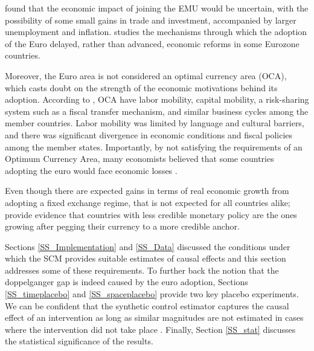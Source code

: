 \documentclass[12pt]{article}
\begin{document}
\cite{Feldstein1997} found that the economic impact of joining the EMU would be uncertain, with the possibility of some small gains in trade and investment, accompanied by larger unemployment and inflation. \cite{Fernandez2013} studies the mechanisms through which the adoption of the Euro delayed, rather than advanced, economic reforms in some Eurozone countries.

Moreover, the Euro area is not considered an optimal currency area (OCA), which casts doubt on the strength of the economic motivations behind its adoption. According to \citep{Mundell1961}, OCA have labor mobility, capital mobility, a risk-sharing system such as a fiscal transfer mechanism, and similar business cycles among the member countries. Labor mobility was limited by language and cultural barriers, and there was significant divergence in economic conditions and fiscal policies among the member states. Importantly, by not satisfying the requirements of an Optimum Currency Area, many economists believed that some countries adopting the euro would face economic losses \citep{Jonung2009}.

Even though there are expected gains in terms of real economic growth from adopting a fixed exchange regime, that is not expected for all countries alike; \cite{Arvai2023} provide evidence that countries with less credible monetary policy are the ones growing after pegging their currency to a more credible anchor.  

Sections \ref{SS_Implementation} and \ref{SS_Data} discussed the conditions under which the SCM provides suitable estimates of causal effects and this section addresses some of these requirements. To further back the notion that the doppelganger gap is indeed caused by the euro adoption, Sections \ref{SS_timeplacebo} and \ref{SS_spaceplacebo} provide two key placebo experiments. We can be confident that the synthetic control estimator captures the causal effect of an intervention as long as similar magnitudes are not estimated in cases where the intervention did not take place \citep{Born2018}. Finally, Section \ref{SS_stat} discusses the statistical significance of the results. 
\end{document}
